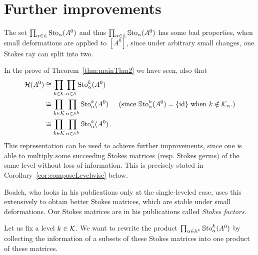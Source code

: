 \section{Further improvements}\label{sec:furtherImprovements}
The set $\prod_{\alpha\in\mathbb{A}}\operatorname{Sto}_\alpha(A^0)$ and thus
$\prod_{\alpha\in\mathbb{A}}\operatorname{\mathbb{S}to}_\alpha(A^0)$ has some bad properties, when small
deformations are applied to $[A^0]$, since under arbitrary small changes, one
Stokes ray can split into two.

In the prove of Theorem~\ref{thm:mainThm2} we have seen,  also that
\begin{align*}
  \mathcal{H}(A^0)&\cong\prod_{k\in\mathcal{K}}\prod_{\alpha\in\mathbb{A}}\operatorname{Sto}_\alpha^k(A^0)
  \\&\cong\prod_{k\in\mathcal{K}}\prod_{\alpha\in\mathbb{A}^k}\operatorname{Sto}_\alpha^k(A^0)
  &\text{(since $\operatorname{\mathbb{S}to}_{\alpha}^{k}(A^0)=\{\operatorname{id}\}$ when $k\notin\mathcal{K}_\alpha$.)}
  \\&\cong\prod_{k\in\mathcal{K}}\prod_{\alpha\in\mathbb{A}^k}\operatorname{\mathbb{S}to}_\alpha^k(A^0) \,.
\end{align*}
This representation can be used to achieve further improvements, since one is
able to multiply some succeeding Stokes matrices (resp. Stokes germs) of the
same level without loss of information.
This is precisely stated in Corollary~\ref{cor:composeLevelwise} below.

\TODO[move?]
Boalch, who looks in his publications \cite{boalch,thboalch} only at the
single-leveled case, uses this extensively to obtain better Stokes matrices,
which are stable under small deformations. Our Stokes matrices are in his
publications called \emph{Stokes factors}.

Let us fix a level $k\in\mathcal{K}$. We want to rewrite the product
$\prod_{\alpha\in\mathbb{A}^k}\operatorname{\mathbb{S}to}_\alpha^k(A^0)$ by collecting the information of a
subsets of these Stokes matrices into one product of these matrices.

